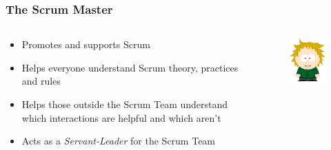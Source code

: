 \begin{frame}
	\frametitle{The Scrum Master}
	
	\begin{columns}
		\begin{column}{0.7\textwidth}
			\begin{itemize}
        		\setlength\itemsep{0.7em}
        		\item Promotes and supports Scrum
        		\item Helps everyone understand Scrum theory, practices and rules 
        		\item Helps those outside the Scrum Team understand which interactions are helpful and which aren't
        		\item Acts as a \textit{Servant-Leader} for the Scrum Team
        	\end{itemize}
		\end{column}
		\begin{column}{0.3\textwidth}
		    \vspace{-2em}
			\begin{figure}
                \includegraphics[width=1.6in]{images/sm.jpg}\\
            \end{figure}
		\end{column}
	\end{columns}
\end{frame}